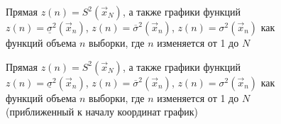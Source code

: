 \documentclass[12pt]{report}
\begin{document}
\begin{figure}[!h]
	\caption{Прямая $z(n) = S^2(\vec x_N)$, а также графики функций $z(n) = \underline \sigma^2(\vec x_n)$, $z(n) = \overline \sigma^2(\vec x_n)$, $z(n) = \sigma^2(\vec x_n)$ как функций объема $n$ выборки, где $n$ изменяется от 1 до $N$}
\end{figure}

\begin{figure}[!h]
	\caption{Прямая $z(n) = S^2(\vec x_N)$, а также графики функций $z(n) = \underline \sigma^2(\vec x_n)$, $z(n) = \overline\sigma^2(\vec x_n)$, $z(n) = \sigma^2(\vec x_n)$ как функций объема $n$ выборки, где $n$ изменяется от 1 до $N$ (приближенный к началу координат график)}
\end{figure}
\end{document}
